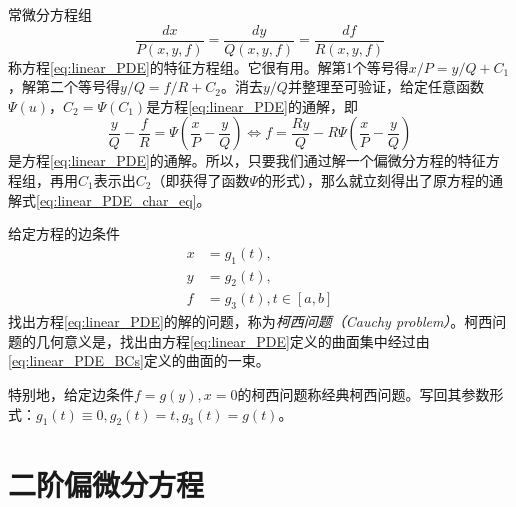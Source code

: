 \documentclass[main.tex]{subfiles}
\begin{document}
常微分方程组
\[
    \frac{dx}{P\left(x,y,f\right)}=\frac{dy}{Q\left(x,y,f\right)}=\frac{df}{R\left(x,y,f\right)}
\]
称方程\eqref{eq:linear_PDE}的特征方程组。它很有用。解第1个等号得$x/P=y/Q+C_1$，解第二个等号得$y/Q=f/R+C_2$。消去$y/Q$并整理至可验证，给定任意函数$\Psi\left(u\right)$，$C_2=\Psi\left(C_1\right)$是方程\eqref{eq:linear_PDE}的通解，即
\begin{equation}\label{eq:linear_PDE_char_eq}
    \frac{y}{Q}-\frac{f}{R}=\Psi\left(\frac{x}{P}-\frac{y}{Q}\right)\Leftrightarrow f=\frac{Ry}{Q}-R\Psi\left(\frac{x}{P}-\frac{y}{Q}\right)
\end{equation}
是方程\eqref{eq:linear_PDE}的通解。所以，只要我们通过解一个偏微分方程的特征方程组，再用$C_1$表示出$C_2$（即获得了函数$\Psi$的形式），那么就立刻得出了原方程的通解式\eqref{eq:linear_PDE_char_eq}。

给定方程的边条件
\begin{align}\label{eq:linear_PDE_BCs}
    x & =g_1\left(t\right),                      \\
    y & =g_2\left(t\right),                      \\
    f & =g_3\left(t\right), t\in\left[a,b\right]
\end{align}
找出方程\eqref{eq:linear_PDE}的解的问题，称为\emph{柯西问题（Cauchy problem）}。柯西问题的几何意义是，找出由方程\eqref{eq:linear_PDE}定义的曲面集中经过由\eqref{eq:linear_PDE_BCs}定义的曲面的一束。

特别地，给定边条件$f=g\left(y\right),x=0$的柯西问题称经典柯西问题。写回其参数形式：$g_1\left(t\right)\equiv 0,g_2\left(t\right)=t,g_3\left(t\right)=g\left(t\right)$。

\section{二阶偏微分方程}
\end{document}
